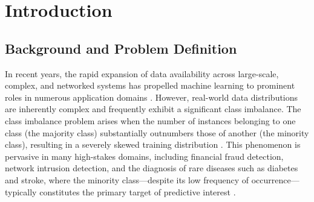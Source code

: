 \documentclass[sigconf]{acmart}
\begin{document}



\maketitle


\section{Introduction}

\subsection{Background and Problem Definition}
In recent years, the rapid expansion of data availability across large-scale, complex, and networked systems has propelled machine learning to prominent roles in numerous application domains \cite{1}.
However, real-world data distributions are inherently complex and frequently exhibit a significant class imbalance. The class imbalance problem arises when the number of instances belonging to one class (the majority class) substantially outnumbers those of another (the minority class), resulting in a severely skewed training distribution \cite{1, 2}.
This phenomenon is pervasive in many high-stakes domains, including financial fraud detection, network intrusion detection, and the diagnosis of rare diseases such as diabetes and stroke, where the minority class---despite its low frequency of occurrence---typically constitutes the primary target of predictive interest \cite{3, 4}.
 
\end{document}
